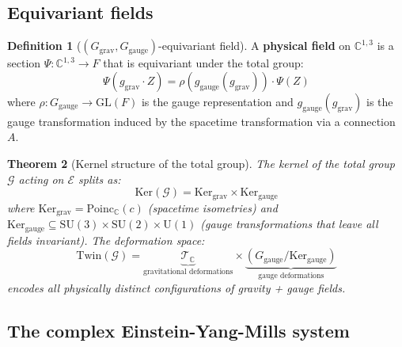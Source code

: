 \documentclass[12pt]{article}
\theoremstyle{plain}
\newtheorem{theorem}{Theorem}[section]
\theoremstyle{definition}
\newtheorem{definition}[theorem]{Definition}
\theoremstyle{remark}
\newcommand{\Ker}{\mathrm{Ker}}
\newcommand{\Twin}{\mathrm{Twin}}
\newcommand{\Poinc}{\mathrm{Poinc}}
\newcommand{\SU}{\mathrm{SU}}
\newcommand{\GL}{\mathrm{GL}}
\newcommand{\UU}{\mathrm{U}}
\newcommand{\CC}{\mathbb{C}}
\begin{document}
\subsection{Equivariant fields}

\begin{definition}[$(G_{\mathrm{grav}}, G_{\mathrm{gauge}})$-equivariant field]\label{def:field}
A \textbf{physical field} on $\CC^{1,3}$ is a section $\Psi: \CC^{1,3} \to F$ that is equivariant under the total group:
\begin{equation}\label{eq:field-equivariant}
\Psi(g_{\mathrm{grav}} \cdot Z) = \rho(g_{\mathrm{gauge}}(g_{\mathrm{grav}})) \cdot \Psi(Z)
\end{equation}
where $\rho: G_{\mathrm{gauge}} \to \GL(F)$ is the gauge representation and $g_{\mathrm{gauge}}(g_{\mathrm{grav}})$ is the gauge transformation induced by the spacetime transformation via a connection $A$.
\end{definition}

\begin{theorem}[Kernel structure of the total group]\label{thm:total-kernel}
The kernel of the total group $\mathcal{G}$ acting on $\mathcal{E}$ splits as:
\begin{equation}
\Ker(\mathcal{G}) = \Ker_{\mathrm{grav}} \times \Ker_{\mathrm{gauge}}
\end{equation}
where $\Ker_{\mathrm{grav}} = \Poinc_\CC(c)$ (spacetime isometries) and $\Ker_{\mathrm{gauge}} \subseteq \SU(3) \times \SU(2) \times \UU(1)$ (gauge transformations that leave all fields invariant). The deformation space:
\begin{equation}
\Twin(\mathcal{G}) = \underbrace{\mathcal{T}_\CC}_{\text{gravitational deformations}} \times \underbrace{(G_{\mathrm{gauge}}/\Ker_{\mathrm{gauge}})}_{\text{gauge deformations}}
\end{equation}
encodes all physically distinct configurations of gravity + gauge fields.
\end{theorem}

\subsection{The complex Einstein-Yang-Mills system}
\end{document}
